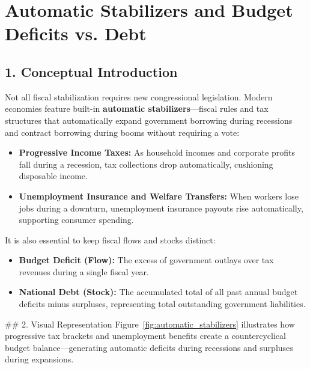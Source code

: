 \documentclass[11pt,letterpaper]{article}
\begin{document}
\section{Automatic Stabilizers and Budget Deficits vs. Debt}

\subsection*{1. Conceptual Introduction}
Not all fiscal stabilization requires new congressional legislation. Modern economies feature built-in \textbf{automatic stabilizers}—fiscal rules and tax structures that automatically expand government borrowing during recessions and contract borrowing during booms without requiring a vote:
\begin{itemize}
    \item \textbf{Progressive Income Taxes:} As household incomes and corporate profits fall during a recession, tax collections drop automatically, cushioning disposable income.
    \item \textbf{Unemployment Insurance and Welfare Transfers:} When workers lose jobs during a downturn, unemployment insurance payouts rise automatically, supporting consumer spending.
\end{itemize}

It is also essential to keep fiscal flows and stocks distinct:
\begin{itemize}
    \item \textbf{Budget Deficit (Flow):} The excess of government outlays over tax revenues during a single fiscal year.
    \item \textbf{National Debt (Stock):} The accumulated total of all past annual budget deficits minus surpluses, representing total outstanding government liabilities.
\end{itemize}

## 2. Visual Representation
Figure~\ref{fig:automatic_stabilizers} illustrates how progressive tax brackets and unemployment benefits create a countercyclical budget balance—generating automatic deficits during recessions and surpluses during expansions.
\end{document}
